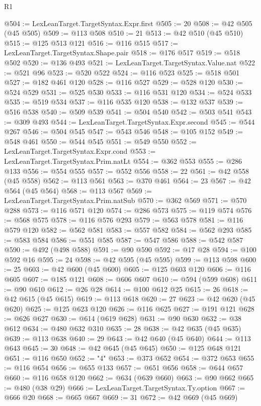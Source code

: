 \begin{lexlean}{R1}
\begin{coremodule}
@504 := LexLeanTarget.TargetSyntax.Expr.first
@505 := 20
@508 := @42 @505 (@45 @505)
@509 := @113 @508
@510 := 21
@513 := @42 @510 (@45 @510)
@515 := @125 @513 @121
@516 := @116 @515
@517 := LexLeanTarget.TargetSyntax.Shape.pair
@518 := @176 @517
@519 := @518 @502
@520 := @136 @493
@521 := LexLeanTarget.TargetSyntax.Value.nat
@522 := @521 @96
@523 := @520 @522
@524 := @116 @523
@525 := @518 @501
@527 := @182 @461 @120
@528 := @116 @527
@529 := @528 @120
@530 := @524 @529
@531 := @525 @530
@533 := @116 @531 @120
@534 := @524 @533
@535 := @519 @534
@537 := @116 @535 @120
@538 := @132 @537
@539 := @516 @538
@540 := @509 @539
@541 := @504 @540
@542 := @503 @541
@543 := @309 @493
@544 := LexLeanTarget.TargetSyntax.Expr.second
@545 := @544 @267
@546 := @504 @545
@547 := @543 @546
@548 := @105 @152
@549 := @548 @461
@550 := @544 @545
@551 := @549 @550
@552 := LexLeanTarget.TargetSyntax.Expr.cond
@553 := LexLeanTarget.TargetSyntax.Prim.natLt
@554 := @362 @553
@555 := @286 @133
@556 := @554 @555
@557 := @552 @556
@558 := 22
@561 := @42 @558 (@45 @558)
@562 := @113 @561
@563 := @370 @461
@564 := 23
@567 := @42 @564 (@45 @564)
@568 := @113 @567
@569 := LexLeanTarget.TargetSyntax.Prim.natSub
@570 := @362 @569
@571 := @570 @288
@573 := @116 @571 @120
@574 := @286 @573
@575 := @119 @574
@576 := @568 @575
@578 := @116 @576 @293
@579 := @563 @578
@581 := @116 @579 @120
@582 := @562 @581
@583 := @557 @582
@584 := @562 @293
@585 := @583 @584
@586 := @551 @585
@587 := @547 @586
@588 := @542 @587
@590 := @492 (@498 @588)
@591 := @90 @590
@592 := @17 @28
@594 := @100 @592 @16
@595 := 24
@598 := @42 @595 (@45 @595)
@599 := @113 @598
@600 := 25
@603 := @42 @600 (@45 @600)
@605 := @125 @603 @120
@606 := @116 @605
@607 := @185 @121
@608 := @606 @607
@610 := @594 (@599 @608)
@611 := @90 @610
@612 := @26 @28
@614 := @100 @612 @25
@615 := 26
@618 := @42 @615 (@45 @615)
@619 := @113 @618
@620 := 27
@623 := @42 @620 (@45 @620)
@625 := @125 @623 @120
@626 := @116 @625
@627 := @191 @121
@628 := @626 @627
@630 := @614 (@619 @628)
@631 := @90 @630
@632 := @38 @612
@634 := @480 @632 @310
@635 := 28
@638 := @42 @635 (@45 @635)
@639 := @113 @638
@640 := 29
@643 := @42 @640 (@45 @640)
@644 := @113 @643
@645 := 30
@648 := @42 @645 (@45 @645)
@650 := @125 @648 @121
@651 := @116 @650
@652 := "4"
@653 := @373 @652
@654 := @372 @653
@655 := @116 @654
@656 := @655 @133
@657 := @651 @656
@658 := @644 @657
@660 := @116 @658 @120
@662 := @634 (@639 @660)
@663 := @90 @662
@665 := @480 (@38 @29)
@666 := LexLeanTarget.TargetSyntax.Ty.option
@667 := @666 @20
@668 := @665 @667
@669 := 31
@672 := @42 @669 (@45 @669)

\end{coremodule}
\end{lexlean}
